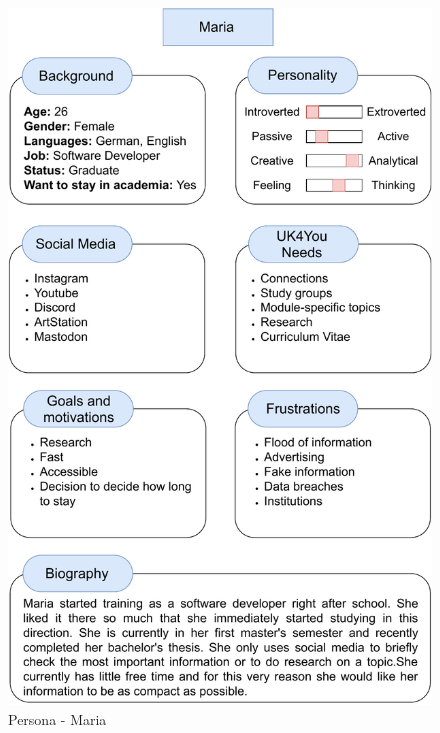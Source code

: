 \begin{figure}[ht]
    \centering
    \includegraphics[width=0.8\columnwidth]{figures/Persona2.pdf}
    \caption{\label{fig:persona-two} Persona - Maria}
\end{figure}
